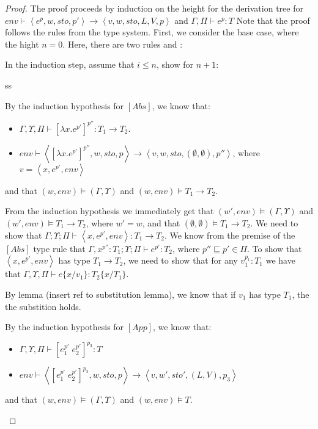 \documentclass[../../../master.tex]{subfiles}
\begin{document}
\begin{proof}
	The proof proceeds by induction on the height for the derivation tree for $env\vdash\left\langle e^p,w,sto,p'\right\rangle\rightarrow\left\langle v,w,sto,L,V,p\right\rangle$ and $\Gamma,\Pi\vdash e^p:T$
	Note that the proof follows the rules from the type system.
	First, we consider the base case, where the hight $n=0$.
	Here, there are two rules  and :
	\begin{description}
		
		
	\end{description}

	In the induction step, assume that $i\leq n$, show for $n+1$:
	\begin{description}
		

		\iffalse
		\item[$\lbrack Let \; rec \rbrack$] ss
		\item[$\lbrack Abs \rbrack$] By the induction hypothesis for $[Abs]$, we know that:
			\begin{itemize}
				\item $\Gamma,\Upsilon,\Pi\vdash [\lambda x.e^{p'}]^{p''}:T_1\rightarrow T_2$.
				\item $env\vdash\left\langle [\lambda x.e^{p'}]^{p''},w,sto,p\right\rangle\rightarrow\left\langle v,w,sto,(\emptyset,\emptyset),p''\right\rangle$, where $v=\left\langle x, e^{p'}, env \right\rangle$
			\end{itemize}
			and that $(w,env)\models(\Gamma,\Upsilon)$ and $(w,env)\models T_1\rightarrow T_2$.

			From the induction hypothesis we immediately get that $(w',env)\models(\Gamma,\Upsilon)$ and $(w',env)\models T_1\rightarrow T_2$, where $w'=w$, and that $(\emptyset,\emptyset)\models T_1\rightarrow T_2$.
			We need to show that $\Gamma;\Upsilon;\Pi\vdash \left\langle x, e^{p'}, env \right\rangle:T_1\rightarrow T_2$.
			We know from the premise of the $[Abs]$ type rule that $\Gamma,x^{p''}:T_1;\Upsilon;\Pi\vdash e^{p'}:T_2$, where $p''\sqsubseteq p'\in\Pi$.
			To show that $\left\langle x, e^{p'}, env \right\rangle$ has type $T_1\rightarrow T_2$, we need to show that for any $v_1^{p_1}:T_1$ we have that $\Gamma,\Upsilon,\Pi\vdash e\{x/v_1\} : T_2\{x/T_1\}$.

			By lemma (insert ref to substitution lemma), we know that if $v_1$ has type $T_1$, the the substition holds.


		\item[$\lbrack App \rbrack$] By the induction hypothesis for $[App]$, we know that:
			\begin{itemize}
				\item $\Gamma,\Upsilon,\Pi\vdash [e_1^{p'}\;e_2^{p'}]^{p_3}:T$
				\item $env\vdash\left\langle [e_1^{p'}\;e_2^{p'}]^{p_3},w,sto,p\right\rangle\rightarrow\left\langle v,w',sto',(L,V),p_3\right\rangle$
			\end{itemize}
			and that $(w,env)\models(\Gamma,\Upsilon)$ and $(w,env)\models T$.


\end{description}
\end{proof}
\end{document}
